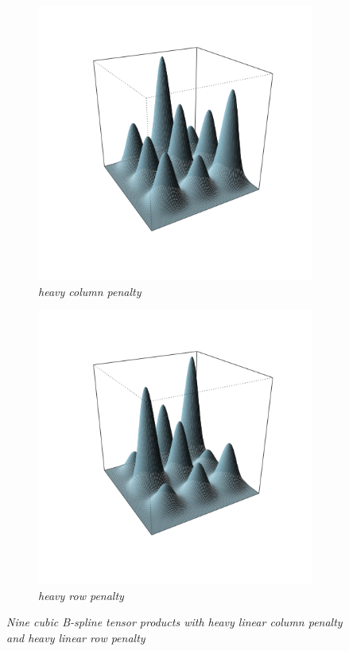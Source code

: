 \begin{figure}[H] 
 \begin{subfigure}{.48\textwidth}
  \centering
   \graphicspath{{img/}}
 \includegraphics[scale=0.5]{"model selection/effective dimension/2d_PS_section_figure1_big_col_lambda"}
 \caption{\textit{heavy column penalty}}
 \label{fig:2D_PS_big_col_penalty}
 \end{subfigure}
 \begin{subfigure}{.48\textwidth}
  \centering
   \graphicspath{{img/}}
  \includegraphics[scale=0.5]{"model selection/effective dimension/2d_PS_section_figure1_big_row_lambda"}
 \caption{\textit{heavy row penalty}}
\label{fig:2D_PS_big_row_penalty}
 \end{subfigure}
 \caption{\textit{Nine cubic B-spline tensor products with heavy linear column penalty and heavy linear row penalty}}\label{fig:2d_PS_penalty_demo}
\end{figure}


